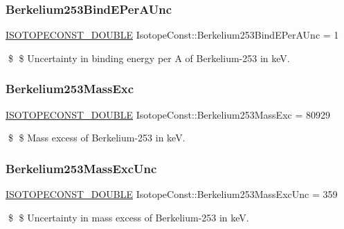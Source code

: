 \subsubsection{\texorpdfstring{Berkelium253\+Bind\+E\+Per\+A\+Unc}{Berkelium253BindEPerAUnc}}
{\footnotesize\ttfamily \mbox{\hyperlink{group___isotope_const-_macros_ga8f45a7272ce02c0b4c65c44636ed719a}{I\+S\+O\+T\+O\+P\+E\+C\+O\+N\+S\+T\+\_\+\+D\+O\+U\+B\+LE}} Isotope\+Const\+::\+Berkelium253\+Bind\+E\+Per\+A\+Unc = 1}

\$ \$ Uncertainty in binding energy per A of Berkelium-\/253 in keV. \mbox{\label{group___isotope_const-_berkelium-_bk253_gadd0ee39cfe383382cda4e9d72ac60c29}} 
\subsubsection{\texorpdfstring{Berkelium253\+Mass\+Exc}{Berkelium253MassExc}}
{\footnotesize\ttfamily \mbox{\hyperlink{group___isotope_const-_macros_ga8f45a7272ce02c0b4c65c44636ed719a}{I\+S\+O\+T\+O\+P\+E\+C\+O\+N\+S\+T\+\_\+\+D\+O\+U\+B\+LE}} Isotope\+Const\+::\+Berkelium253\+Mass\+Exc = 80929}

\$ \$ Mass excess of Berkelium-\/253 in keV. \mbox{\label{group___isotope_const-_berkelium-_bk253_gae743b7eae03114b996a40470c0f863bc}} 
\subsubsection{\texorpdfstring{Berkelium253\+Mass\+Exc\+Unc}{Berkelium253MassExcUnc}}
{\footnotesize\ttfamily \mbox{\hyperlink{group___isotope_const-_macros_ga8f45a7272ce02c0b4c65c44636ed719a}{I\+S\+O\+T\+O\+P\+E\+C\+O\+N\+S\+T\+\_\+\+D\+O\+U\+B\+LE}} Isotope\+Const\+::\+Berkelium253\+Mass\+Exc\+Unc = 359}

\$ \$ Uncertainty in mass excess of Berkelium-\/253 in keV. \mbox{\label{group___isotope_const-_berkelium-_bk253_ga6c82202868ee6f2bcfc3e48b929403ea}} 
